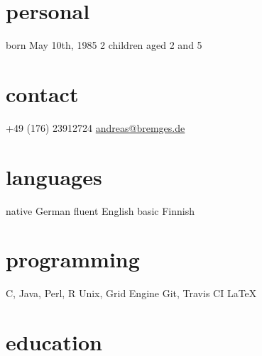 \documentclass[print]{friggeri-cv}
\begin{document}


\begin{aside} %
\section{personal}
born May 10th, 1985
2 children aged 2 and 5
\section{contact}
+49 (176) 23912724
\href{mailto:andreas@bremges.de}{andreas@bremges.de}
\section{languages}
native German
fluent English
basic Finnish
\section{programming}
C, Java, Perl, R
Unix, Grid Engine
Git, Travis CI
\LaTeX
\end{aside}


\section{education}
\end{document}
